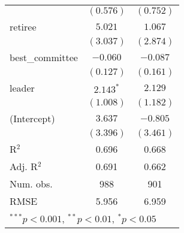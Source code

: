 \documentclass[12pt]{article}
\begin{document}
\begin{table}
\begin{center}
\begin{tabular}{l c c }
			& $(0.576)$      & $(0.752)$      \\
			retiree                  & $5.021$        & $1.067$        \\
			& $(3.037)$      & $(2.874)$      \\
			best\_committee          & $-0.060$       & $-0.087$       \\
			& $(0.127)$      & $(0.161)$      \\
			leader                   & $2.143^{*}$    & $2.129$        \\
			& $(1.008)$      & $(1.182)$      \\
			(Intercept)              & $3.637$        & $-0.805$       \\
			& $(3.396)$      & $(3.461)$      \\
			\hline
			R$^2$                    & 0.696          & 0.668          \\
			Adj. R$^2$               & 0.691          & 0.662          \\
			Num. obs.                & 988            & 901            \\
			RMSE                     & 5.956          & 6.959          \\
			\hline
			\multicolumn{3}{l}{\scriptsize{$^{***}p<0.001$, $^{**}p<0.01$, $^*p<0.05$}}
		\end{tabular}
	\end{center}
\end{table}
\end{document}
